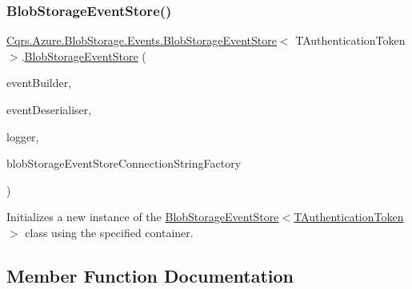 \subsubsection{\texorpdfstring{Blob\+Storage\+Event\+Store()}{BlobStorageEventStore()}}
{\footnotesize\ttfamily \hyperlink{classCqrs_1_1Azure_1_1BlobStorage_1_1Events_1_1BlobStorageEventStore}{Cqrs.\+Azure.\+Blob\+Storage.\+Events.\+Blob\+Storage\+Event\+Store}$<$ T\+Authentication\+Token $>$.\hyperlink{classCqrs_1_1Azure_1_1BlobStorage_1_1Events_1_1BlobStorageEventStore}{Blob\+Storage\+Event\+Store} (\begin{DoxyParamCaption}\item[{\hyperlink{interfaceCqrs_1_1Events_1_1IEventBuilder}{I\+Event\+Builder}$<$ T\+Authentication\+Token $>$}]{event\+Builder,  }\item[{\hyperlink{interfaceCqrs_1_1Events_1_1IEventDeserialiser}{I\+Event\+Deserialiser}$<$ T\+Authentication\+Token $>$}]{event\+Deserialiser,  }\item[{I\+Logger}]{logger,  }\item[{\hyperlink{interfaceCqrs_1_1Azure_1_1BlobStorage_1_1IBlobStorageStoreConnectionStringFactory}{I\+Blob\+Storage\+Store\+Connection\+String\+Factory}}]{blob\+Storage\+Event\+Store\+Connection\+String\+Factory }\end{DoxyParamCaption})}



Initializes a new instance of the \hyperlink{classCqrs_1_1Azure_1_1BlobStorage_1_1Events_1_1BlobStorageEventStore_a04ce4516e7e1d30339d3f04ba54abe54_a04ce4516e7e1d30339d3f04ba54abe54}{Blob\+Storage\+Event\+Store$<$\+T\+Authentication\+Token$>$} class using the specified container. 



\subsection{Member Function Documentation}
\mbox{\label{classCqrs_1_1Azure_1_1BlobStorage_1_1Events_1_1BlobStorageEventStore_ab68b594c54ae5a79e3b8d5db1902752d_ab68b594c54ae5a79e3b8d5db1902752d}} 
